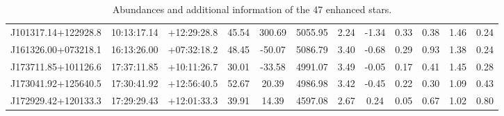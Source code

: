 \documentclass[a4paper,fleqn,usenatbib]{mnras}
\begin{document}
\begin{table}
\begin{tabular}{@{}cccccccccccc@{}}
			J101317.14+122928.8 & 10:13:17.14 & +12:29:28.8  & 45.54               	& 300.69              	& 5055.95             	& 2.24           	& -1.34              	& 0.33                   	& 0.38                     	& 1.46             	& 0.24       	\\
			J161326.00+073218.1 & 16:13:26.00 & +07:32:18.2  & 48.45               	& -50.07              	& 5086.79             	& 3.40           	& -0.68              	& 0.29                   	& 0.93                     	& 1.38             	& 0.24       	\\
			J173711.85+101126.6 & 17:37:11.85 & +10:11:26.7  & 30.01               	& -33.58              	& 4991.07             	& 3.49           	& -0.05              	& 0.17                   	& 0.41                     	& 1.45             	& 0.28       	\\
			J173041.92+125640.5 & 17:30:41.92 & +12:56:40.5  & 52.67               	& 20.39               	& 4986.98             	& 3.42           	& -0.45              	& 0.22                   	& 0.30                     	& 1.09             	& 0.43       	\\
			J172929.42+120133.3 & 17:29:29.43 & +12:01:33.3  & 39.91               	& 14.39               	& 4597.08             	& 2.67           	& 0.24               	& 0.05                   	& 0.67                     	& 1.02             	& 0.80       	\\ \bottomrule
		\end{tabular}
		\caption{Abundances and additional information of the 47 enhanced stars.}
	\end{table}
	
	
	
	
	
	\label{lastpage}
\end{document}
